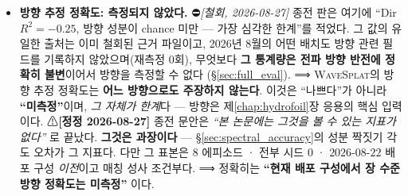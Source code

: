 \documentclass[11pt]{report}
\numberwithin{equation}{chapter}
\numberwithin{figure}{chapter}
\numberwithin{table}{chapter}
\newcommand{\WS}{\textsc{WaveSplat}}
\begin{document}
\begin{itemize}
        않았다.
  \item \textbf{방향 추정 정확도: 측정되지 않았다.} ⛔\emph{[철회, 2026-08-27]}
        종전 판은 여기에 ``Dir $R^2 = -0.25$, 방향 성분이 chance 미만 --- 가장 심각한
        한계''를 적었다. 그 값의 유일한 출처는 이미 철회된 근거 파일이고, 2026년 8월의
        어떤 배치도 방향 관련 필드를 기록하지 않았으며(재측정 0회), 무엇보다
        \textbf{그 통계량은 전파 방향 반전에 정확히 불변}이어서 방향을 측정할 수 없다
        (\S\ref{sec:full_eval}). ⟹ \WS{}의 방향 추정 정확도는 \textbf{어느 방향으로도
        주장하지 않는다}. 이것은 ``나쁘다''가 아니라 \textbf{``미측정''}이며,
        \emph{그 자체가 한계}다 --- 방향은 제\ref{chap:hydrofoil}장 응용의 핵심 입력이다.
        ⚠\textbf{[정정 2026-08-27]} 종전 문안은 \emph{``본 논문에는 그것을 볼 수 있는 지표가
        없다''} 로 끝났다. \textbf{그것은 과장이다} --- \S\ref{sec:spectral_accuracy}의
        성분 짝짓기 각도 오차가 그 지표다. 다만 그 표본은 $8$ 에피소드 · 전부 시드 $0$ ·
        $2026$-$08$-$22$ 배포 구성 \emph{이전}이고 매칭 성사 조건부다.
        ⟹ 정확히는 \textbf{``현재 배포 구성에서 장 수준 방향 정확도는 미측정''} 이다.

\end{itemize}
\end{document}
